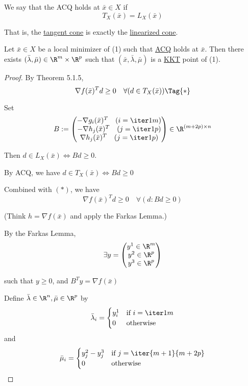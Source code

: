 We say that the ACQ holds at $\bar x\in X$ if
$$
  T_X(\bar x)=L_X(\bar x)
$$

That is, the \href{add7a4b}{tangent cone} is exactly the
\href{ca4f471}{linearized cone}.

\label{b1c5437}

Let $\bar x\in X$ be a local minimizer of (1) such that \href{adc266e}{ACQ}
holds at $\bar x$. Then there exists $(\bar\lambda,\bar\mu)\in\R^m\times\R^p$
such that $(\bar x,\bar\lambda,\bar\mu)$ is a \href{b38093d}{KKT} point of (1).

\begin{proof}
  \def\bm{\bar\mu}\def\bl{\bar\lambda}\def\bx{\bar x}
  By Theorem 5.1.5,
  \begin{equation*}
    \nabla f(\bx)^Td\geq0\quad\forall(d\in T_X(\bx))\Tag{*}
  \end{equation*}

  Set
  $$
    B:=\begin{pmatrix}
      -\nabla g_i(\bx)^T\quad(i=\iter1m) \\
      -\nabla h_j(\bx)^T\quad(j=\iter1p) \\
      \nabla h_j(\bx)^T\quad(j=\iter1p)
    \end{pmatrix}\in\R^{(m+2p)\times{n}}
  $$

  Then $d\in L_X(\bx)\iff Bd\geq0$.

  By ACQ, we have $d\in T_X(\bx)\iff Bd\geq0$

  Combined with $(*)$, we have
  $$
    \nabla f(\bx)^Td\geq0\quad\forall(d:Bd\geq0)
  $$

  (Think $h=\nabla f(\bx)$ and apply the Farkas Lemma.)

  By the Farkas Lemma,
  $$
    \exists y=\begin{pmatrix}y^1\in\R^m\\y^2\in\R^p\\y^3\in\R^p\end{pmatrix}
  $$

  such that $y\geq0$, and $B^Ty=\nabla f(\bx)$

  Define $\bl\in\R^n,\bm\in\R^p$ by
  $$
    \bl_i=\begin{cases}
      y^1_i & \text{if $i=\iter1m$} \\
      0     & \text{otherwise}
    \end{cases}
  $$
  and
  $$
    \bm_i=\begin{cases}
      y^2_j - y^3_j & \text{if $j=\iter{m+1}{m+2p}$} \\
      0             & \text{otherwise}
    \end{cases}
  $$


\end{proof}
